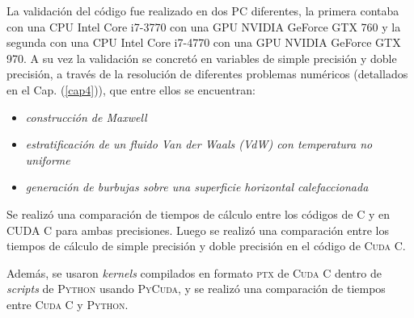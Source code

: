 La validación del código fue realizado en dos PC diferentes, la primera contaba con una CPU Intel Core i7-3770 con una GPU NVIDIA GeForce GTX 760 y la segunda con una CPU Intel Core i7-4770 con una GPU NVIDIA GeForce GTX 970. A su vez la validación se concretó en variables de simple precisión y doble precisión, a través de la resolución de diferentes problemas numéricos (detallados en el Cap. (\ref{cap4})), que entre ellos se encuentran:

\begin{itemize}
	\item \textit{construcción de Maxwell}
	\item \textit{estratificación de un fluido Van der Waals (VdW) con temperatura no uniforme}
	\item \textit{generación de burbujas sobre una superficie horizontal calefaccionada}
\end{itemize} 

Se realizó una comparación de tiempos de cálculo entre los códigos de \textsc{C} y en \textsc{CUDA C} para ambas precisiones. Luego se realizó una comparación entre los tiempos de cálculo de simple precisión y doble precisión en el código de \textsc{Cuda C}.

Además, se usaron \textit{kernels} compilados en formato \textsc{ptx} de \textsc{Cuda C} dentro de \textit{scripts} de \textsc{Python} usando \textsc{PyCuda}, y se realizó una comparación de tiempos entre \textsc{Cuda C} y \textsc{Python}.


